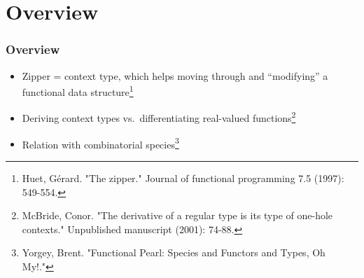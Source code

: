 \section{Overview}

\begin{frame}
\frametitle{Overview}

\begin{itemize}
\item Zipper = context type, which helps moving through and ``modifying'' a functional data structure\footnote{Huet, Gérard. "The zipper." Journal of functional programming 7.5 (1997): 549-554.}
\item Deriving context types vs.\ differentiating real-valued functions\footnote{McBride, Conor. "The derivative of a regular type is its type of one-hole contexts." Unpublished manuscript (2001): 74-88.}
\item Relation with combinatorial species\footnote{Yorgey, Brent. "Functional Pearl: Species and Functors and Types, Oh My!."}
\end{itemize}
\end{frame}